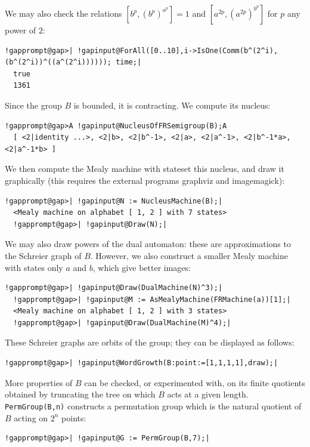 \documentclass[a4paper,11pt]{report}
\begin{document}
{{ We may also check the relations $[b^p,(b^p)^{a^p}]=1$ and $[a^{2p},(a^{2p})^{b^p}]$ for $p$ any power of $2$: 
\begin{Verbatim}[commandchars=!@|,fontsize=\small,frame=single,label=Example]
  !gapprompt@gap>| !gapinput@ForAll([0..10],i->IsOne(Comm(b^(2^i),(b^(2^i))^((a^(2^i)))))); time;|
  true
  1361
\end{Verbatim}
 Since the group $B$ is bounded, it is contracting. We compute its nucleus: 
\begin{Verbatim}[commandchars=!@A,fontsize=\small,frame=single,label=Example]
  !gapprompt@gap>A !gapinput@NucleusOfFRSemigroup(B);A
  [ <2|identity ...>, <2|b>, <2|b^-1>, <2|a>, <2|a^-1>, <2|b^-1*a>, <2|a^-1*b> ]
\end{Verbatim}
 We then compute the Mealy machine with stateset this nucleus, and draw it
graphically (this requires the external programs \textsf{graphviz} and \textsf{imagemagick}): 
\begin{Verbatim}[commandchars=!@|,fontsize=\small,frame=single,label=Example]
  !gapprompt@gap>| !gapinput@N := NucleusMachine(B);|
  <Mealy machine on alphabet [ 1, 2 ] with 7 states>
  !gapprompt@gap>| !gapinput@Draw(N);|
\end{Verbatim}
 We may also draw powers of the dual automaton: these are approximations to the
Schreier graph of $B$. However, we also construct a smaller Mealy machine with states only $a$ and $b$, which give better images: 
\begin{Verbatim}[commandchars=!@|,fontsize=\small,frame=single,label=Example]
  !gapprompt@gap>| !gapinput@Draw(DualMachine(N)^3);|
  !gapprompt@gap>| !gapinput@M := AsMealyMachine(FRMachine(a))[1];|
  <Mealy machine on alphabet [ 1, 2 ] with 3 states>
  !gapprompt@gap>| !gapinput@Draw(DualMachine(M)^4);|
\end{Verbatim}
 These Schreier graphs are orbits of the group; they can be displayed as
follows: 
\begin{Verbatim}[commandchars=!@|,fontsize=\small,frame=single,label=Example]
  !gapprompt@gap>| !gapinput@WordGrowth(B:point:=[1,1,1,1],draw);|
\end{Verbatim}
 More properties of $B$ can be checked, or experimented with, on its finite quotients obtained by
truncating the tree on which $B$ acts at a given length. \texttt{PermGroup(B,n)} constructs a permutation group which is the natural quotient of $B$ acting on $2^n$ points: 
\begin{Verbatim}[commandchars=!@|,fontsize=\small,frame=single,label=Example]
  !gapprompt@gap>| !gapinput@G := PermGroup(B,7);|

\end{Verbatim}}}
\end{document}
